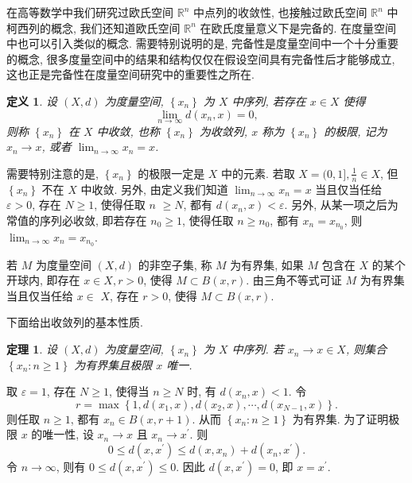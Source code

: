 \documentclass[openany]{ctexbook}
\makeatletter
\theoremstyle{kaiti}
\newtheorem{definition}{定义}[section]
\newtheorem{theorem}{定理}[section]
\theoremstyle{normal}
\renewenvironment{proof}[1][\proofname]{\par
    \pushQED{\qed}%
    \normalfont \topsep6\p@\@plus6\p@\relax
    \trivlist
    \item\relax
    {\heiti #1}\hspace{2\labelsep}\ignorespaces
  }{%
    \popQED\endtrivlist\@endpefalse
  }
\makeatother
\begin{document}
在高等数学中我们研究过欧氏空间 $\mathbb{R}^n$ 中点列的收敛性, 也接触过欧氏空间 $\mathbb{R}^n$ 中柯西列的概念, 我们还知道欧氏空间 $\mathbb{R}^n$ 在欧氏度量意义下是完备的. 在度量空间中也可以引入类似的概念. 需要特别说明的是, 完备性是度量空间中一个十分重要的概念, 很多度量空间中的结果和结构仅仅在假设空间具有完备性后才能够成立, 这也正是完备性在度量空间研究中的重要性之所在.

\begin{definition}
  设 $(X, d)$ 为度量空间, $\left\{x_n\right\}$ 为 $X$ 中序列, 若存在 $x \in X$ 使得 
  $$
  \lim_{n \rightarrow \infty} d\left(x_n, x\right)=0,
  $$
  则称 $\left\{x_n\right\}$ 在 $X$ 中收敛, 也称 $\left\{x_n\right\}$ 为收敛列, $x$ 称为 $\left\{x_n\right\}$ 的极限, 记为 $x_n \rightarrow x$, 或者 $\lim_{n \rightarrow \infty} x_n=x$. 
\end{definition}

需要特别注意的是, $\left\{x_n\right\}$ 的极限一定是 $X$ 中的元素. 若取 $X=(0,1], \frac{1}{n} \in X$, 但 $\left\{x_n\right\}$ 不在 $X$ 中收敛. 另外, 由定义我们知道 $\lim_{n \rightarrow \infty} x_n=x$ 当且仅当任给 $\varepsilon>0$, 存在 $N \geqslant 1$, 使得任取 $n$ $\geqslant N$, 都有 $d\left(x_n, x\right)<\varepsilon$. 另外, 从某一项之后为常值的序列必收敛, 即若存在 $n_0 \geqslant 1$, 使得任取 $n \geqslant n_0$, 都有 $x_n=x_{n_0}$, 则 $\lim_{n \rightarrow \infty} x_n=x_{n_0}$.

若 $M$ 为度量空间 $(X, d)$ 的非空子集, 称 $M$ 为有界集, 如果 $M$ 包含在 $X$ 的某个开球内, 即存在 $x \in X, r>0$, 使得 $M \subset B(x, r)$. 由三角不等式可证 $M$ 为有界集当且仅当任给 $x \in$ $X$, 存在 $r>0$, 使得 $M \subset B(x, r)$.

下面给出收敛列的基本性质.

\begin{theorem}
  设 $(X, d)$ 为度量空间, $\left\{x_n\right\}$ 为 $X$ 中序列. 若 $x_n \rightarrow x \in X$, 则集合 $\left\{x_n: n \geqslant 1\right\}$ 为有界集且极限 $x$ 唯一.
\end{theorem}

\begin{proof}
取 $\varepsilon=1$, 存在 $N \geqslant 1$, 使得当 $n \geqslant N$ 时, 有 $d\left(x_n, x\right)<1$. 令
$$
r=\max\left\{1, d\left(x_1, x\right), d\left(x_2, x\right), \cdots, d\left(x_{N-1}, x\right)\right\}.
$$
则任取 $n \geqslant 1$, 都有 $x_n \in B(x, r+1)$. 从而 $\left\{x_n: n \geqslant 1\right\}$ 为有界集.
为了证明极限 $x$ 的唯一性, 设 $x_n \rightarrow x$ 且 $x_n \rightarrow x^{\prime}$. 则
$$
0 \leqslant d\left(x, x^{\prime}\right) \leqslant d\left(x, x_n\right)+d\left(x_n, x^{\prime}\right).
$$
令 $n \rightarrow \infty$, 则有 $0 \leqslant d\left(x, x^{\prime}\right) \leqslant 0$. 因此 $d\left(x, x^{\prime}\right)=0$, 即 $x=x^{\prime}$.
\end{proof}
\end{document}
